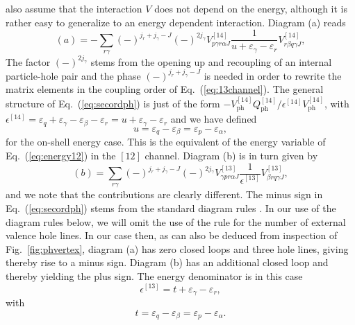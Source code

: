 \documentclass{article}
\begin{document}
also assume that the interaction $V$ does not depend on the energy,
although
it is rather easy to generalize to an energy dependent
interaction.
Diagram (a) reads
\begin{equation}
      (a)=-\sum_{r\gamma}(-)^{j_r+j_{\gamma}-J}(-)^{2j_{\gamma}}
      V^{[14]}_{p\gamma r\alpha J}
      \frac{1}{u+\varepsilon_{\gamma}-
                \varepsilon_{r}} V^{[14]}_{r\beta q\gamma J},
       \label{eq:secordph}
\end{equation}
The factor $(-)^{2j_{\gamma}}$ stems from the opening up
and recoupling of an internal particle-hole pair \cite{kstop81}
and the phase $(-)^{j_r+j_{\gamma}-J}$ is needed in order
to rewrite the matrix elements in the coupling order of
Eq.\ (\ref{eq:13channel}).
The general structure of Eq.\ (\ref{eq:secordph}) is
just of the form $-V_{\mathrm{ph}}^{[14]}Q^{[14]}_{\mathrm{ph}}/\epsilon^{[14]}V_{\mathrm{ph}}^{[14]}$, with
$ \epsilon^{[14]}=\varepsilon_{q}+\varepsilon_{\gamma}-\varepsilon_{\beta}-
                \varepsilon_{r}=u+\varepsilon_{\gamma}-\varepsilon_{r}$
and we have defined
\begin{equation}
  u=\varepsilon_{q}-\varepsilon_{\beta}=\varepsilon_{p}-\varepsilon_{\alpha},
\end{equation}
for the on-shell energy case.
This is the equivalent of the energy variable of Eq.\ (\ref{eq:energy12}) in
the $[12]$ channel.
Diagram (b) is in turn given by
\begin{equation}
      (b)=\sum_{r\gamma}(-)^{j_r+j_{\gamma}-J}(-)^{2j_{\gamma}}
      V^{[13]}_{\gamma pr\alpha J}
      \frac{1}{\epsilon^{[13]}}V^{[13]}_{\beta rq\gamma J} ,
       \label{eq:secordphdirect}
\end{equation}
and we note that the contributions are clearly different.
The minus sign in Eq.\ (\ref{eq:secordph}) stems from the standard
diagram rules \cite{kstop81}.
In our use of the diagram rules below, we will omit the use
of the rule for the number of external valence hole lines.
In our case then, as can also be deduced from inspection of
Fig.\ \ref{fig:phvertex}, diagram (a) has  zero closed loops and
three hole lines,
giving thereby rise to a minus sign.
Diagram (b) has an additional closed
loop and thereby yielding the plus sign.
The energy denominator is in this case
\begin{equation}
      \epsilon^{[13]}=t+\varepsilon_{\gamma}-\varepsilon_{r},
\end{equation}
with
\begin{equation}
  t=\varepsilon_{q}-\varepsilon_{\beta}=\varepsilon_{p}-\varepsilon_{\alpha}.
\end{equation}
\end{document}
